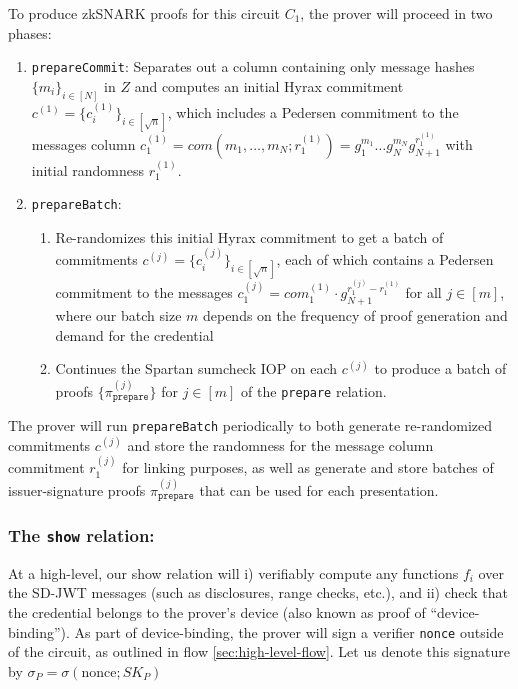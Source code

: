 To produce zkSNARK proofs for this circuit $C_1$, the prover will proceed in two phases:
\begin{enumerate}
\item \texttt{prepareCommit}: Separates out a column containing only message hashes $\{m_i\}_{i \in [N]}$ in $Z$ and computes an initial Hyrax commitment $c^{(1)} = \{c_i^{(1)}\}_{i \in [\sqrt{n}]}$, which includes a Pedersen commitment to the messages column $c_1^{(1)} = com(m_1, \dots, m_N; r_1^{(1)}) = g_1^{m_1} \dots g_N^{m_N} g_{N+1}^{r_1^{(1)}}$ with initial randomness $r_1^{(1)}$. 
\item \texttt{prepareBatch}: 
    \begin{enumerate}
        \item Re-randomizes this initial Hyrax commitment to get a batch of commitments $c^{(j)} = \{c_i^{(j)}\}_{i \in [\sqrt{n}]}$, each of which contains a Pedersen commitment to the messages $c_1^{(j)} = com_1^{(1)} \cdot g_{N+1}^{r_1^{(j)}-r_1^{(1)}}$ for all $j \in [m]$, 
        where our batch size $m$ depends on the frequency of proof generation and demand for the credential
        \item Continues the Spartan sumcheck IOP on each $c^{(j)}$ to produce a batch of proofs $\{\pi_{\texttt{prepare}}^{(j)}\}$ for $j \in [m]$ of the \texttt{prepare} relation.
    \end{enumerate}
\end{enumerate}
    
The prover will run \texttt{prepareBatch} periodically to both generate re-randomized commitments $c^{(j)}$ and store the randomness for the message column commitment $r_1^{(j)}$ for linking purposes, 
as well as generate and store batches of issuer-signature proofs $\pi_{\texttt{prepare}}^{(j)}$ that can be used for each presentation.

\subsubsection{The \texttt{show} relation:}

At a high-level, our show relation will i) verifiably compute any functions $f_i$ over the SD-JWT messages (such as disclosures, range checks, etc.),
and ii) check that the credential belongs to the prover's device (also known as proof of ``device-binding''). 
As part of device-binding, the prover will sign a verifier \texttt{nonce} outside of the circuit, as outlined in flow \ref{sec:high-level-flow}. 
Let us denote this signature by $\sigma_P = \sigma(\text{nonce}; SK_P)$

